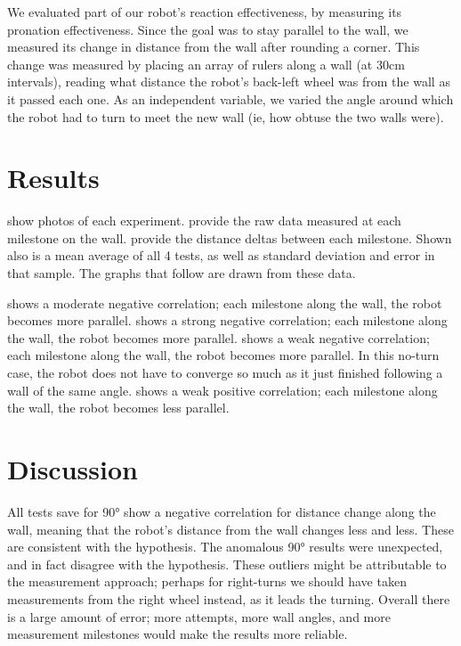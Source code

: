 \documentclass[a4paper,12pt]{article}
\begin{document}
We evaluated part of our robot's reaction effectiveness, by measuring its pronation effectiveness. Since the goal was to stay parallel to the wall, we measured its change in distance from the wall after rounding a corner. This change was measured by placing an array of rulers along a wall (at 30cm intervals), reading what distance the robot's back-left wheel was from the wall as it passed each one. As an independent variable, we varied the angle around which the robot had to turn to meet the new wall (ie, how obtuse the two walls were).

\section{Results}

%



%

 show photos of each experiment.
 provide the raw data measured at each milestone on the wall.
 provide the distance deltas between each milestone. Shown also is a mean average of all 4 tests, as well as standard deviation and error in that sample. The graphs that follow are drawn from these data.

 shows a moderate negative correlation; each milestone along the wall, the robot becomes more parallel.
 shows a strong negative correlation; each milestone along the wall, the robot becomes more parallel.
 shows a weak negative correlation; each milestone along the wall, the robot becomes more parallel. In this no-turn case, the robot does not have to converge so much as it just finished following a wall of the same angle.
 shows a weak positive correlation; each milestone along the wall, the robot becomes less parallel.

\section{Discussion}

All tests save for \ang{90} show a negative correlation for distance change along the wall, meaning that the robot's distance from the wall changes less and less. These are consistent with the hypothesis. The anomalous \ang{90} results were unexpected, and in fact disagree with the hypothesis. These outliers might be attributable to the measurement approach; perhaps for right-turns we should have taken measurements from the right wheel instead, as it leads the turning. Overall there is a large amount of error; more attempts, more wall angles, and more measurement milestones would make the results more reliable.
\end{document}
